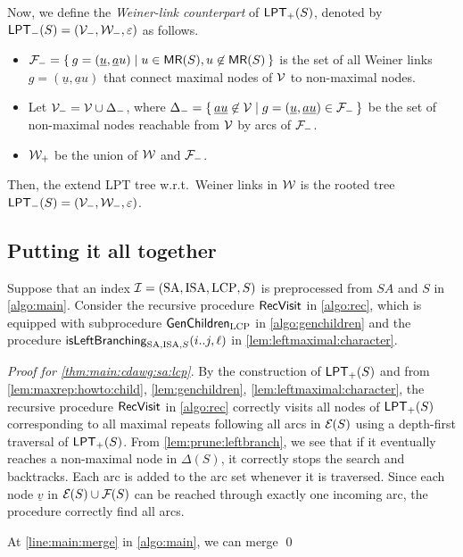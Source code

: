 \documentclass{article}
\begin{document}
Now, we define the \textit{Weiner-link counterpart} of $\LPT[+](S)$, denoted by $\LPT[-](S) = (\sig V_-, \sig W_-, \eps)$ as follows.
\begin{itemize}
\item $\sig F_- = \sete{ g = (\underline u, \underline au) \mid u\in\MR(S), u\not\in \MR(S) }$ is the set of all Weiner links $g = (\underline u, \underline au)$ that connect maximal nodes of $\sig V$ to non-maximal nodes. 
\item Let $\sig V_- = \sig V \cup \Delta_-$, 
  where $\Delta_- = \sete{\underline{au} \not\in\sig V \mid g = (\underline u, \underline{au}) \in \sig F_-}$ be the set of non-maximal nodes reachable from $\sig V$ by arcs of $\sig F_-$.
  
\item $\sig W_+$ be the union of $\sig W$ and $\sig F_-$. 
\end{itemize}

Then, the extend LPT tree w.r.t.~Weiner links in $\sig W$ is the rooted tree $\LPT[-](S) = (\sig V_-, \sig W_-, \eps)$. 



\subsection{Putting it all together}

Suppose that an index $\sig I = (\SA, \ISA, \LCP, S)$ is preprocessed from $SA$ and $S$ in \cref{algo:main}. 
Consider the recursive procedure $\Rec$ in \cref{algo:rec}, which is equipped with subprocedure $\GenChildren$ in \cref{algo:genchildren} and the procedure $\isLeftBranching(i..j, \ell)$ in \cref{lem:leftmaximal:character}. 

\begin{trivlist}\item[]
\textit{Proof for \cref{thm:main:cdawg:sa:lcp}}. 
By the construction of $\LPT[+](S)$ and from
\cref{lem:maxrep:howto:child},
\cref{lem:genchildren},
\cref{lem:leftmaximal:character},
the recursive procedure $\Rec$ in \cref{algo:rec} correctly visits all nodes of $\LPT[+](S)$ corresponding to all maximal repeats following all arcs in $\E(S)$ using a depth-first traversal of $\LPT[+](S)$.
From \cref{lem:prune:leftbranch}, we see that if it eventually reaches a non-maximal node in $\Delta(S)$, it correctly stops the search and backtracks. Each arc is added to the arc set whenever it is traversed. Since each node $\underline v$ in $\E(S)\cup \F(S)$ can be reached through exactly one incoming arc, the procedure correctly find all arcs.

At \cref{line:main:merge} in \cref{algo:main}, we can merge 
\qed
\end{trivlist}
\end{document}
